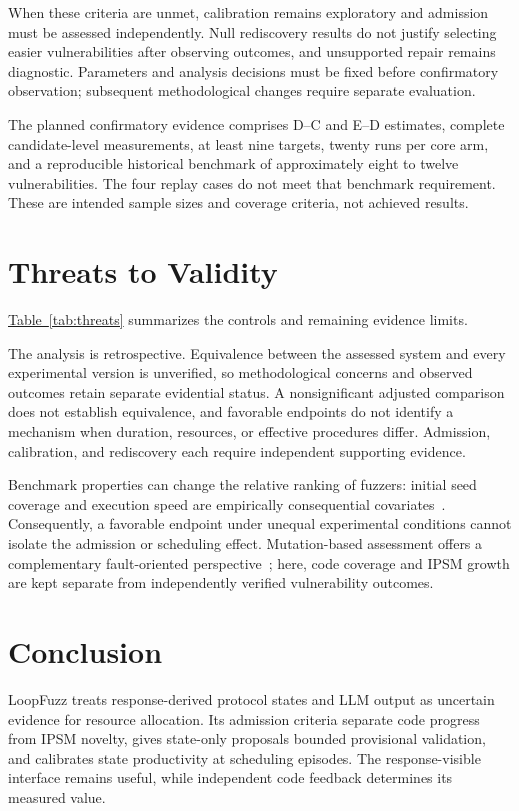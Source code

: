 \documentclass[final,5p,times,number]{elsarticle}
\newcommand{\namedref}[2]{\hyperref[#2]{#1~\ref*{#2}}}
\begin{document}
When these criteria are unmet, calibration remains exploratory and admission must be assessed independently. Null rediscovery results do not justify selecting easier vulnerabilities after observing outcomes, and unsupported repair remains diagnostic. Parameters and analysis decisions must be fixed before confirmatory observation; subsequent methodological changes require separate evaluation.

The planned confirmatory evidence comprises D--C and E--D estimates, complete candidate-level measurements, at least nine targets, twenty runs per core arm, and a reproducible historical benchmark of approximately eight to twelve vulnerabilities. The four replay cases do not meet that benchmark requirement. These are intended sample sizes and coverage criteria, not achieved results.

\section{Threats to Validity}
\namedref{Table}{tab:threats} summarizes the controls and remaining evidence limits.
\label{sec:threats}


The analysis is retrospective. Equivalence between the assessed system and every experimental version is unverified, so methodological concerns and observed outcomes retain separate evidential status. A nonsignificant adjusted comparison does not establish equivalence, and favorable endpoints do not identify a mechanism when duration, resources, or effective procedures differ. Admission, calibration, and rediscovery each require independent supporting evidence.

Benchmark properties can change the relative ranking of fuzzers: initial seed coverage and execution speed are empirically consequential covariates~\cite{benchmarkproperties}. Consequently, a favorable endpoint under unequal experimental conditions cannot isolate the admission or scheduling effect. Mutation-based assessment offers a complementary fault-oriented perspective~\cite{mutationassessment2023}; here, code coverage and IPSM growth are kept separate from independently verified vulnerability outcomes.

\section{Conclusion}
LoopFuzz treats response-derived protocol states and LLM output as uncertain evidence for resource allocation. Its admission criteria separate code progress from IPSM novelty, gives state-only proposals bounded provisional validation, and calibrates state productivity at scheduling episodes. The response-visible interface remains useful, while independent code feedback determines its measured value.
\end{document}

